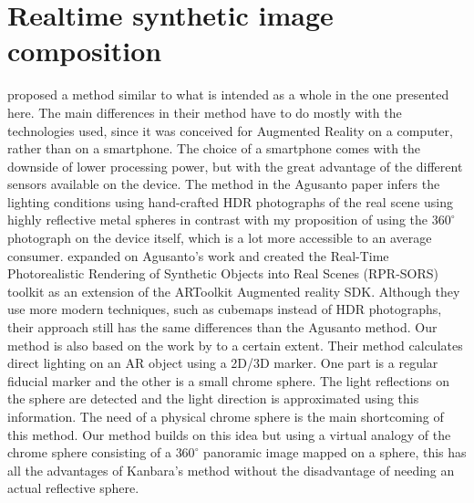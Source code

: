 \section{Realtime synthetic image composition}
\cite{agusanto2003} proposed a method similar to what is intended as a whole in the one presented here. The main differences in their method have to do mostly with the technologies used, since it was conceived for Augmented Reality on a computer, rather than on a smartphone. The choice of a smartphone comes with the downside of lower processing power, but with the great advantage of the different sensors available on the device. The method in the Agusanto paper infers the lighting conditions using hand-crafted HDR photographs of the real scene using highly reflective metal spheres in contrast with my proposition of using the $360^{\circ}$ photograph on the device itself, which is a lot more accessible to an average consumer.\newline
\cite{pessoa2011} expanded on Agusanto's work and created the Real-Time Photorealistic Rendering of Synthetic Objects into Real Scenes (RPR-SORS) toolkit as an extension of the ARToolkit Augmented reality SDK. Although they use more modern techniques, such as cubemaps instead of HDR photographs, their approach still has the same differences than the Agusanto method.\newline
Our method is also based on the work by \cite{kanbara2004} to a certain extent. Their method calculates direct lighting on an AR object using a 2D/3D marker. One part is a regular fiducial marker and the other is a small chrome sphere. The light reflections on the sphere are detected and the light direction is approximated using this information. The need of a physical chrome sphere is the main shortcoming of this method. Our method builds on this idea but using a virtual analogy of the chrome sphere consisting of a $360^{\circ}$ panoramic image mapped on a sphere, this has all the advantages of Kanbara's method without the disadvantage of needing an actual reflective sphere.